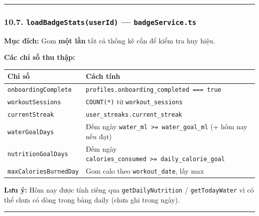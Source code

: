 \documentclass[12pt,a4paper]{article}
\begin{document}
\begin{center}\rule{0.5\linewidth}{0.5pt}\end{center}

\subsubsection{\texorpdfstring{10.7. \texttt{loadBadgeStats(userId)} ---
\texttt{badgeService.ts}}{10.7. loadBadgeStats(userId) --- badgeService.ts}}\label{loadbadgestatsuserid-badgeservice.ts}

\textbf{Mục đích:} Gom \textbf{một lần} tất cả thống kê cần để kiểm tra
huy hiệu.

\textbf{Các chỉ số thu thập:}

{\def\LTcaptype{none} %
\begin{longtable}[]{@{}
  >{\raggedright\arraybackslash}p{}
  >{\raggedright\arraybackslash}p{}@{}}
\toprule\noalign{}
\begin{minipage}[b]{\linewidth}\raggedright
Chỉ số
\end{minipage} & \begin{minipage}[b]{\linewidth}\raggedright
Cách tính
\end{minipage} \\
\midrule\noalign{}
\endhead
\bottomrule\noalign{}
\endlastfoot
\texttt{onboardingComplete} &
\texttt{profiles.onboarding\_completed\ ===\ true} \\
\texttt{workoutSessions} & \texttt{COUNT(*)} từ
\texttt{workout\_sessions} \\
\texttt{currentStreak} & \texttt{user\_streaks.current\_streak} \\
\texttt{waterGoalDays} & Đếm ngày
\texttt{water\_ml\ \textgreater{}=\ water\_goal\_ml} (+ hôm nay nếu
đạt) \\
\texttt{nutritionGoalDays} & Đếm ngày
\texttt{calories\_consumed\ \textgreater{}=\ daily\_calorie\_goal} \\
\texttt{maxCaloriesBurnedDay} & Gom calo theo \texttt{workout\_date},
lấy max \\
\end{longtable}
}

\textbf{Lưu ý:} Hôm nay được tính riêng qua \texttt{getDailyNutrition} /
\texttt{getTodayWater} vì có thể chưa có dòng trong bảng daily (chưa ghi
trong ngày).

\begin{center}\rule{0.5\linewidth}{0.5pt}\end{center}
\end{document}

